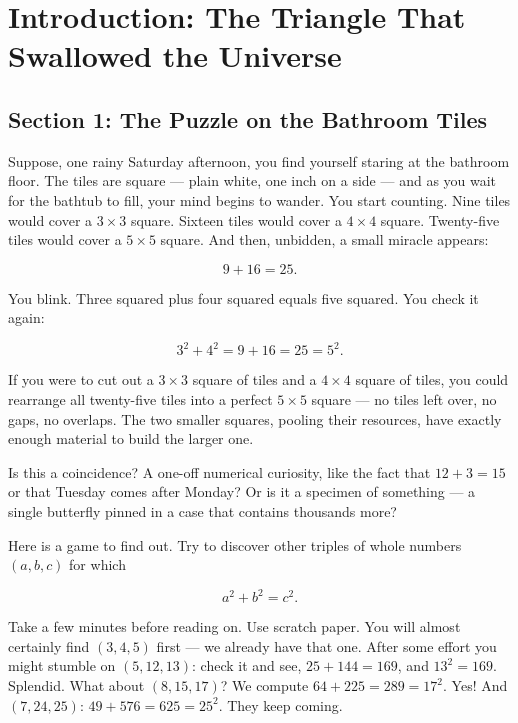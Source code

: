 \chapter*{Introduction: The Triangle That Swallowed the Universe}

\section*{Section 1: The Puzzle on the Bathroom Tiles}
Suppose, one rainy Saturday afternoon, you find yourself staring at the bathroom floor. The tiles are square --- plain white, one inch on a side --- and as you wait for the bathtub to fill, your mind begins to wander. You start counting. Nine tiles would cover a \(3 \times 3\) square. Sixteen tiles would cover a \(4 \times 4\) square. Twenty-five tiles would cover a \(5 \times 5\) square. And then, unbidden, a small miracle appears:

\[9 + 16 = 25.\]

You blink. Three squared plus four squared equals five squared. You check it again:

\[3^2 + 4^2 = 9 + 16 = 25 = 5^2.\]

If you were to cut out a \(3 \times 3\) square of tiles and a \(4 \times 4\) square of tiles, you could rearrange all twenty-five tiles into a perfect \(5 \times 5\) square --- no tiles left over, no gaps, no overlaps. The two smaller squares, pooling their resources, have exactly enough material to build the larger one.

Is this a coincidence? A one-off numerical curiosity, like the fact that \(12 + 3 = 15\) or that Tuesday comes after Monday? Or is it a specimen of something --- a single butterfly pinned in a case that contains thousands more?

Here is a game to find out. Try to discover other triples of whole numbers \((a, b, c)\) for which

\[a^2 + b^2 = c^2.\]

Take a few minutes before reading on. Use scratch paper. You will almost certainly find \((3, 4, 5)\) first --- we already have that one. After some effort you might stumble on \((5, 12, 13)\): check it and see, \(25 + 144 = 169\), and \(13^2 = 169\). Splendid. What about \((8, 15, 17)\)? We compute \(64 + 225 = 289 = 17^2\). Yes! And \((7, 24, 25)\): \(49 + 576 = 625 = 25^2\). They keep coming.


